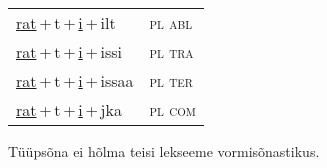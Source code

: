 \begin{minipage}{\textwidth}
\begin{sideways}
\begin{tabular}{l l}
\underline{rat}\,+\,t\,+\,\underline{i}\,+\,ilt & \textsc{ pl abl } \\
\underline{rat}\,+\,t\,+\,\underline{i}\,+\,issi & \textsc{ pl tra } \\
\underline{rat}\,+\,t\,+\,\underline{i}\,+\,issaa & \textsc{ pl ter } \\
\underline{rat}\,+\,t\,+\,\underline{i}\,+\,jka & \textsc{ pl com } \\
\end{tabular}
\end{sideways}
\label{tab:tüüpsõnamall-ratiz}

\end{minipage}

 
\vspace{1em}
\noindent Tüüpsõna ei hõlma teisi lekseeme vormi\-sõnastikus.
